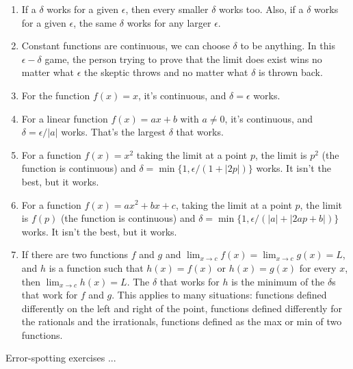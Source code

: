 \documentclass[10pt]{amsart}
\begin{document}
\begin{enumerate}
\item If a $\delta$ works for a given $\epsilon$, then every smaller
  $\delta$ works too. Also, if a $\delta$ works for a given
  $\epsilon$, the same $\delta$ works for any larger $\epsilon$.
\item Constant functions are continuous, we can choose $\delta$ to be
  anything. In this $\epsilon-\delta$ game, the person trying to prove
  that the limit does exist wins no matter what $\epsilon$ the skeptic
  throws and no matter what $\delta$ is thrown back.
\item For the function $f(x) = x$, it's continuous, and $\delta =
\epsilon$ works.
\item For a linear function $f(x) = ax + b$ with $a \ne 0$, it's
  continuous, and $\delta = \epsilon/|a|$ works. That's the largest
  $\delta$ that works.
\item For a function $f(x) = x^2$ taking the limit at a point $p$, the
  limit is $p^2$ (the function is continuous) and $\delta = \min\{1,
  \epsilon/(1 + |2p|) \}$ works. It isn't the best, but it works.
\item For a function $f(x) = ax^2 + bx + c$, taking the limit at a
  point $p$, the limit is $f(p)$ (the function is continuous) and
  $\delta = \min \{1, \epsilon/(|a| + |2ap + b|) \}$ works. It isn't
  the best, but it works.
\item If there are two functions $f$ and $g$ and $\lim_{x \to c} f(x)
  = \lim_{x \to c} g(x) = L$, and $h$ is a function such that $h(x) =
  f(x)$ or $h(x) = g(x)$ for every $x$, then $\lim_{x \to c} h(x) =
  L$. The $\delta$ that works for $h$ is the minimum of the $\delta$s
  that work for $f$ and $g$. This applies to many situations:
  functions defined differently on the left and right of the point,
  functions defined differently for the rationals and the irrationals,
  functions defined as the max or min of two functions.
\end{enumerate}

Error-spotting exercises ...
\end{document}
